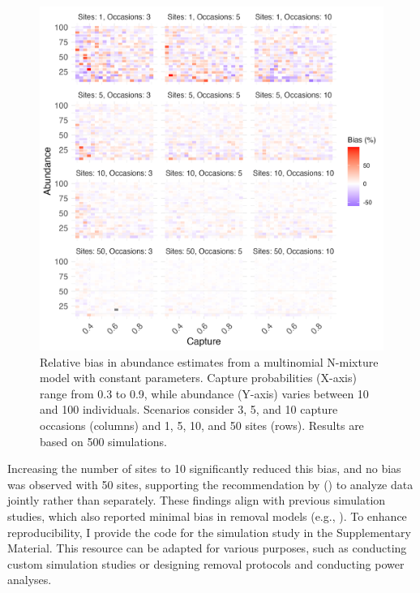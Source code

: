 \documentclass[
  11pt,
  a4paper,
]{article}
\begin{document}
\begin{figure}[H]

{\centering \includegraphics[width=0.98\linewidth]{heatmap_bias} 

}

\caption{Relative bias in abundance estimates from a multinomial N-mixture model with constant parameters. Capture probabilities (X-axis) range from 0.3 to 0.9, while abundance (Y-axis) varies between 10 and 100 individuals. Scenarios consider 3, 5, and 10 capture occasions (columns) and 1, 5, 10, and 50 sites (rows). Results are based on 500 simulations.}\label{fig:bias}
\end{figure}

Increasing the number of sites to 10 significantly reduced this bias, and no bias was observed with 50 sites, supporting the recommendation by () to analyze data jointly rather than separately. These findings align with previous simulation studies, which also reported minimal bias in removal models (e.g., ). To enhance reproducibility, I provide the code for the simulation study in the Supplementary Material. This resource can be adapted for various purposes, such as conducting custom simulation studies or designing removal protocols and conducting power analyses.
\end{document}

